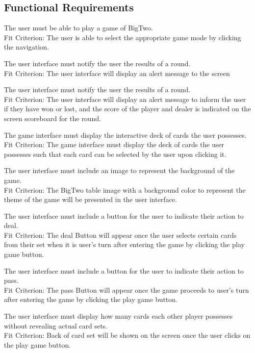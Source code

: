 \documentclass[12pt, titlepage]{article}
\begin{document}
\subsection{Functional Requirements}
\begin{FR}
\item The user must be able to play a game of BigTwo.\\
Fit Criterion: The user is able to select the appropriate game mode by clicking the navigation.
\item The user interface must notify the user the results of a round.\\
Fit Criterion: The user interface will display an alert message to the screen
\item The user interface must notify the user the results of a round.\\
Fit Criterion: The user interface will display an alert message to
inform the user if they have won or lost, and the score of the player
and dealer is indicated on the screen scoreboard for the round.
\item The game interface must display the interactive deck of cards the user possesses. \\
Fit Criterion: The game interface must display the deck of cards the user possesses such that each card can be selected by the user upon clicking it.
\item The user interface must include an image to represent the background
of the game.\\
Fit Criterion: The BigTwo table image with a background color to
represent the theme of the game will be presented in the user interface.
\item The user interface must include a button for the user to indicate their action to deal.\\
Fit Criterion: The deal Button will appear once the user selects certain cards from their set when it is user's turn after entering the game by clicking the play game button.
\item The user interface must include a button for the user to indicate their action to pass.\\
Fit Criterion: The pass Button will appear once the game proceeds to user's turn after entering the game by clicking the play game button.
\item The user interface must display how many cards each other player possesses without revealing actual card sets.\\
Fit Criterion: Back of card set will be shown on the screen once the user clicks on the play game button.

\end{FR}
\end{document}
